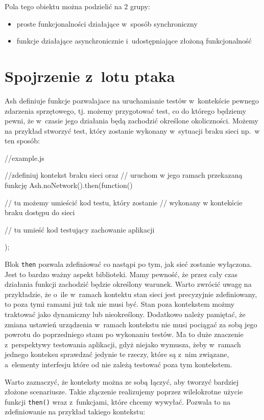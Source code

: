 \documentclass[brudnopis]{xmgr}
\begin{document}
Pola tego obiektu można podzielić na 2 grupy:  
\begin{itemize}
  \item proste funkcjonalności działające w~sposób synchroniczny
  \item funkcje działające asynchronicznie i~udostępniające złożoną funkcjonalność
\end{itemize}

\section{Spojrzenie z~lotu ptaka}

Ash definiuje funkcje pozwalajace na uruchamianie testów w~kontekście pewnego zdarzenia sprzętowego, tj. możemy przygotować test, co do którego będziemy pewni, że w~czasie jego działania będą zachodzić określone okoliczności. Możemy na przykład stworzyć test, który zostanie wykonany w~sytuacji braku sieci np.~w ten sposób:

\begin{javascriptcode}
   //example.js

   //zdefiniuj kontekst braku sieci oraz 
   //  uruchom w jego ramach przekazaną funkcję
    Ash.noNetwork().then(function(){
	//  tu możemy umieścić kod testu, który zostanie 
         //    wykonany w kontekście braku dostępu do sieci 

	// tu umieść kod testujący zachowanie aplikacji  
    });
\end{javascriptcode}

Blok \texttt{then} pozwala zdefiniować co nastąpi po tym, jak sieć zostanie wyłączona. Jest to bardzo ważny aspekt biblioteki. Mamy pewność, że przez cały czas działania funkcji zachodzić będzie określony warunek. Warto zwrócić uwagę na przykładzie, że o~ile w~ramach kontektu stan sieci jest precyzyjnie zdefiniowany, to poza tymi ramami już tak nie musi być. Stan poza kontekstem możmy traktować jako dynamiczny lub nieokreślony. Dodatkowo należy pamiętać, że zmiana ustawień urządzenia w~ramach kontekstu nie musi pociągać za sobą jego powrotu do poprzedniego stanu po wykonaniu testów. Ma to duże znaczenie z~perspektywy testowania aplikacji, gdyż niejako wymusza, żeby w~ramach jednego konteksu sprawdzać jedynie te rzeczy, które są z~nim związane, a~elementy interfesju które od nie zależą testować poza tym kontekstem.

Warto zaznaczyć, że konteksty można ze sobą łączyć, aby tworzyć bardziej złożone scenariusze. Takie złączenie realizujemy poprzez wilelokrotne użycie funkcji \texttt{then()} wraz z~funkcjami, które chcemy wywyłać. Pozwala to na zdefiniowanie na przykład takiego kontekstu:
\end{document}
